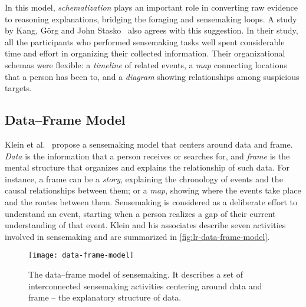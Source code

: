 In this model, \emph{schematization} plays an important role in converting raw evidence to reasoning explanations, bridging the foraging and sensemaking loops. A study by Kang, Görg and John Stasko~\cite{Kang2011} also agrees with this suggestion. In their study, all the participants who performed sensemaking tasks well spent considerable time and effort in organizing their collected information. Their organizational schemas were flexible: a \emph{timeline} of related events, a \emph{map} connecting locations that a person has been to, and a \emph{diagram} showing relationships among suspicious targets.

\subsection{Data--Frame Model}
\label{sub:lr-dfm}
Klein et al.~\cite{Klein2003} propose a sensemaking model that centers around data and frame. \emph{Data} is the information that a person receives or searches for, and \emph{frame} is the mental structure that organizes and explains the relationship of such data. For instance, a frame can be a \emph{story}, explaining the chronology of events and the causal relationships between them; or a \emph{map}, showing where the events take place and the routes between them. Sensemaking is considered as a deliberate effort to understand an event, starting when a person realizes a gap of their current understanding of that event. Klein and his associates describe seven activities involved in sensemaking and are summarized in \autoref{fig:lr-data-frame-model}.

\begin{figure}
	\centering
	\texttt{[image: data-frame-model]}
	\caption[The data--frame model of sensemaking]{The data--frame model of sensemaking. It describes a set of interconnected sensemaking activities centering around data and frame -- the explanatory structure of data. }
	\label{fig:lr-data-frame-model}
\end{figure}

